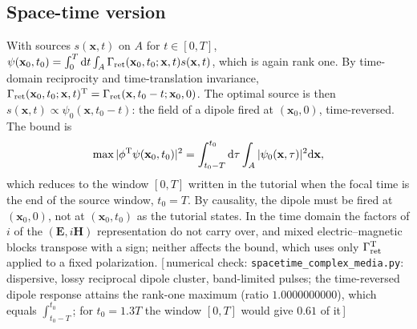 \documentclass[11pt,letterpaper]{article}
\newcommand{\vect}[1]{\mathbf{#1}}
\newcommand{\Ev}{\vect{E}}
\newcommand{\Hv}{\vect{H}}
\newcommand{\xv}{\vect{x}}
\newcommand{\code}[1]{\texttt{\small #1}}
\newcommand{\numcheck}[1]{\hfill{\small\color{green!40!black}[\,numerical check: #1\,]}}
\begin{document}
\subsection{Space-time version}
With sources $s(\xv,t)$ on $A$ for $t\in[0,T]$, $\psi(\xv_0,t_0)=\int_0^T{\rm d}t\int_A\Gamma_{\rm ret}(\xv_0,t_0;\xv,t)s(\xv,t)$, which is again rank one. By time-domain reciprocity and time-translation invariance, $\Gamma_{\rm ret}(\xv_0,t_0;\xv,t)^{\rm T}=\Gamma_{\rm ret}(\xv,t_0-t;\xv_0,0)$. The optimal source is then $s(\xv,t)\propto\psi_0(\xv,t_0-t)$: the field of a dipole fired at $(\xv_0,0)$, time-reversed. The bound is
\begin{align}
    \max|\phi^{\rm T}\psi(\xv_0,t_0)|^2=\int_{t_0-T}^{t_0}{\rm d}\tau\int_A|\psi_0(\xv,\tau)|^2{\rm d}\xv,
\end{align}
which reduces to the window $[0,T]$ written in the tutorial when the focal time is the end of the source window, $t_0=T$. By causality, the dipole must be fired at $(\xv_0,0)$, not at $(\xv_0,t_0)$ as the tutorial states. In the time domain the factors of $i$ of the $(\Ev,i\Hv)$ representation do not carry over, and mixed electric--magnetic blocks transpose with a sign; neither affects the bound, which uses only $\Gamma_{\rm ret}^{\rm T}$ applied to a fixed polarization.
\numcheck{\code{spacetime\_complex\_media.py}: dispersive, lossy reciprocal dipole cluster, band-limited pulses; the time-reversed dipole response attains the rank-one maximum (ratio $1.0000000000$), which equals $\int_{t_0-T}^{t_0}$; for $t_0=1.3T$ the window $[0,T]$ would give $0.61$ of it}

\end{document}
